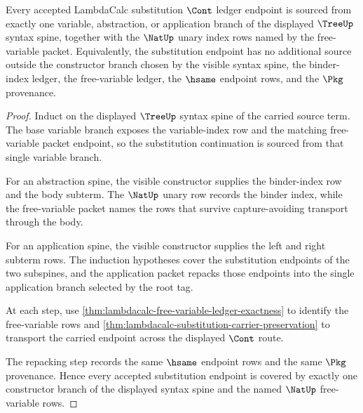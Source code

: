 \begin{theorem}
\label{thm:lambdacalc-substitution-source-coverage}
Every accepted LambdaCalc substitution $\Cont$ ledger endpoint is sourced from
exactly one variable, abstraction, or application branch of the displayed
$\TreeUp$ syntax spine, together with the $\NatUp$ unary index rows named by the
free-variable packet. Equivalently, the substitution endpoint has no additional
source outside the constructor branch chosen by the visible syntax spine, the
binder-index ledger, the free-variable ledger, the $\hsame$ endpoint rows, and
the $\Pkg$ provenance.
\end{theorem}
\begin{proof}
Induct on the displayed $\TreeUp$ syntax spine of the carried source term. The
base variable branch exposes the variable-index row and the matching
free-variable packet endpoint, so the substitution continuation is sourced from
that single variable branch.

For an abstraction spine, the visible constructor supplies the binder-index row
and the body subterm. The $\NatUp$ unary row records the binder index, while the
free-variable packet names the rows that survive capture-avoiding transport
through the body.

For an application spine, the visible constructor supplies the left and right
subterm rows. The induction hypotheses cover the substitution endpoints of the
two subspines, and the application packet repacks those endpoints into the
single application branch selected by the root tag.

At each step, use
\autoref{thm:lambdacalc-free-variable-ledger-exactness} to identify the
free-variable rows and
\autoref{thm:lambdacalc-substitution-carrier-preservation} to transport the
carried endpoint across the displayed $\Cont$ route.

The repacking step records the same $\hsame$ endpoint rows and the same $\Pkg$
provenance. Hence every accepted substitution endpoint is covered by exactly one
constructor branch of the displayed syntax spine and the named $\NatUp$
free-variable rows.
\end{proof}

